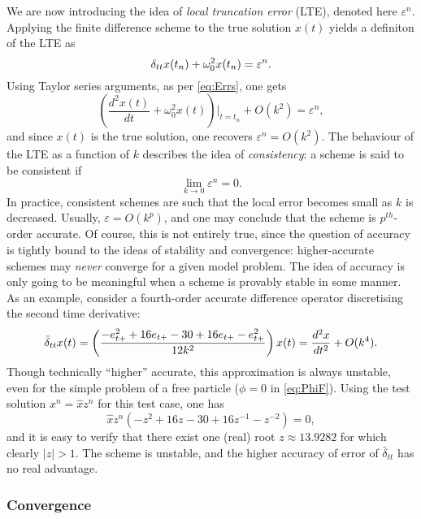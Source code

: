 We are now introducing the idea of   \emph{local truncation error} (LTE), denoted here $\varepsilon^n$. Applying the finite difference scheme to the true solution $x(t)$ yields a definiton of the LTE as
\begin{equation}\label{eq:LTEdef}
    \delta_{tt} x(t_n) + \omega_0^2 x(t_n) = \varepsilon^n.
\end{equation}
Using Taylor series arguments, as per \eqref{eq:Errs}, one gets
\begin{equation}
    \left( \frac{d^2 x(t)}{dt} + \omega_0^2 x(t)\right)|_{t=t_n} + O(k^2) = \varepsilon^n,
\end{equation}
and since $x(t)$ is the true solution, one recovers $\varepsilon^n = O(k^2)$. The behaviour of the LTE as a function of $k$ describes the idea of \emph{consistency}: a scheme is said to be consistent if
\begin{equation}
    \lim_{k\rightarrow 0}\varepsilon^n = 0.
\end{equation}
In practice, consistent schemes are such that the local error becomes small as $k$ is decreased. Usually, $\varepsilon = O(k^p)$, and one may conclude that the scheme is $p^{th}$-order accurate. Of course, this is not entirely true, since the question of accuracy is tightly bound to the ideas of stability and convergence: higher-accurate schemes may \emph{never} converge for a given model problem. The idea of accuracy is only going to be meaningful when a scheme is provably stable in some manner. As an example, consider a fourth-order accurate difference operator discretising the second time derivative:
\begin{equation}\label{eq:FourthOrderdtt}
    \bar\delta_{tt} x(t) = \left(\frac{-e_{t+}^2 + 16 e_{t+} - 30 + 16e_{t+} - e_{t+}^2}{12k^2}\right) x(t) = \frac{d^2 x}{dt^2} + O(k^4).
\end{equation}
Though technically ``higher'' accurate, this approximation is always unstable, even for the simple problem of a free particle ($\phi = 0$ in \eqref{eq:PhiF}). Using the test solution $x^n = \hat x z^n$ for this test case, one has
\begin{equation}
    \hat x z^n \left(-z^2 + 16 z - 30 + 16 z^{-1} - z^{-2}\right) = 0,
\end{equation}
and it is easy to verify that there exist one (real) root $z \approx 13.9282$ for which clearly $|z|>1$. The scheme is unstable, and the higher accuracy of error of $\bar\delta_{tt}$ has no real advantage. 


\subsubsection{Convergence}

